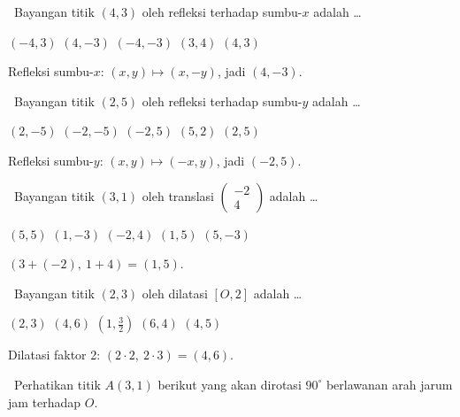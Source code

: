\documentclass[11pt,a4paper]{exam}
\newcommand{\Fund}{{\footnotesize\textsf{\textcolor{hijau}{[Fundamental]}}}\ }
\newcommand{\Inter}{{\footnotesize\textsf{\textcolor{biru}{[Intermediate]}}}\ }
\begin{document}
\begin{questions}

\question \Fund Bayangan titik $(4,3)$ oleh refleksi terhadap sumbu-$x$ adalah \dots
\begin{choices}
\choice $(-4,3)$ \CorrectChoice $(4,-3)$ \choice $(-4,-3)$ \choice $(3,4)$ \choice $(4,3)$
\end{choices}
\begin{solution}Refleksi sumbu-$x$: $(x,y)\mapsto(x,-y)$, jadi $(4,-3).$\end{solution}

\question \Fund Bayangan titik $(2,5)$ oleh refleksi terhadap sumbu-$y$ adalah \dots
\begin{choices}
\choice $(2,-5)$ \choice $(-2,-5)$ \CorrectChoice $(-2,5)$ \choice $(5,2)$ \choice $(2,5)$
\end{choices}
\begin{solution}Refleksi sumbu-$y$: $(x,y)\mapsto(-x,y)$, jadi $(-2,5).$\end{solution}

\question \Inter Bayangan titik $(3,1)$ oleh translasi $\begin{pmatrix} -2\\ 4 \end{pmatrix}$ adalah \dots
\begin{choices}
\choice $(5,5)$ \choice $(1,-3)$ \choice $(-2,4)$ \CorrectChoice $(1,5)$ \choice $(5,-3)$
\end{choices}
\begin{solution}$(3+(-2),\ 1+4) = (1,5).$\end{solution}

\question \Inter Bayangan titik $(2,3)$ oleh dilatasi $[O,2]$ adalah \dots
\begin{choices}
\choice $(2,3)$ \CorrectChoice $(4,6)$ \choice $(1,\tfrac{3}{2})$ \choice $(6,4)$ \choice $(4,5)$
\end{choices}
\begin{solution}Dilatasi faktor 2: $(2\cdot 2,\ 2\cdot 3) = (4,6).$\end{solution}

\question \Inter Perhatikan titik $A(3,1)$ berikut yang akan dirotasi $90^\circ$
berlawanan arah jarum jam terhadap $O$.

\begin{center}
\end{center}


\end{questions}
\end{document}
